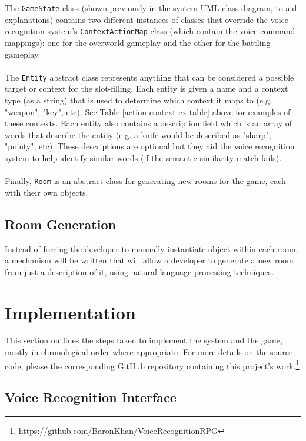 \documentclass[11pt]{article}
\begin{document}
The \texttt{GameState} class (shown previously in the system UML class diagram, to aid explanations) contains two different instances of classes that override the voice recognition system's \texttt{ContextActionMap} class (which contain the voice command mappings): one for the overworld gameplay and the other for the battling gameplay.
\\
\\
The \texttt{Entity} abstract class represents anything that can be considered a possible target or context for the slot-filling. Each entity is given a name and a context type (as a string) that is used to determine which context it maps to (e.g. "weapon", "key", etc). See Table \ref{action-context-ex-table} above for examples of these contexts. Each entity also contains a description field which is an array of words that describe the entity (e.g. a knife would be described as "sharp", "pointy", etc). These descriptions are optional but they aid the voice recognition system to help identify similar words (if the semantic similarity match fails).
\\
\\
Finally, \texttt{Room} is an abstract class for generating new rooms for the game, each with their own objects.

\subsection{Room Generation}

Instead of forcing the developer to manually instantiate object within each room, a mechanism will be written that will allow a developer to generate a new room from just a description of it, using natural language processing techniques.

\newpage
\section{Implementation}

This section outlines the steps taken to implement the system and the game, mostly in chronological order where appropriate. For more details on the source code, please the corresponding GitHub repository containing this project's work.\footnote{https://github.com/BaronKhan/VoiceRecognitionRPG}

\subsection{Voice Recognition Interface}
\end{document}
